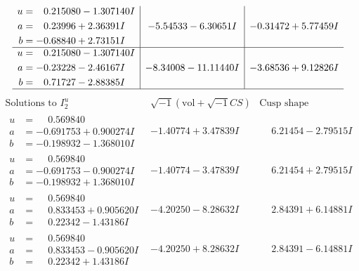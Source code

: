 \documentclass[1p]{elsarticle_modified}
\theoremstyle{definition}
\newcommand{\I}{\sqrt{-1}}
\begin{document}
$$\begin{array}{c|c|c}
\begin{aligned}
u &= \phantom{-}0.215080 - 1.307140 I \\
a &= \phantom{-}0.23996 + 2.36391 I \\
b &= -0.68840 + 2.73151 I\end{aligned}
 & -5.54533 - 6.30651 I & -0.31472 + 5.77459 I \\ \hline\begin{aligned}
u &= \phantom{-}0.215080 - 1.307140 I \\
a &= -0.23228 - 2.46167 I \\
b &= \phantom{-}0.71727 - 2.88385 I\end{aligned}
 & -8.34008 - 11.11440 I & -3.68536 + 9.12826 I\\
 \hline 
 \end{array}$$\newpage$$\begin{array}{c|c|c}  
\text{Solutions to }I^u_{2}& \I (\text{vol} + \sqrt{-1}CS) & \text{Cusp shape}\\
 \hline 
\begin{aligned}
u &= \phantom{-}0.569840\phantom{ +0.000000I} \\
a &= -0.691753 + 0.900274 I \\
b &= -0.198932 - 1.368010 I\end{aligned}
 & -1.40774 + 3.47839 I & \phantom{-}6.21454 - 2.79515 I \\ \hline\begin{aligned}
u &= \phantom{-}0.569840\phantom{ +0.000000I} \\
a &= -0.691753 - 0.900274 I \\
b &= -0.198932 + 1.368010 I\end{aligned}
 & -1.40774 - 3.47839 I & \phantom{-}6.21454 + 2.79515 I \\ \hline\begin{aligned}
u &= \phantom{-}0.569840\phantom{ +0.000000I} \\
a &= \phantom{-}0.833453 + 0.905620 I \\
b &= \phantom{-}0.22342 - 1.43186 I\end{aligned}
 & -4.20250 - 8.28632 I & \phantom{-}2.84391 + 6.14881 I \\ \hline\begin{aligned}
u &= \phantom{-}0.569840\phantom{ +0.000000I} \\
a &= \phantom{-}0.833453 - 0.905620 I \\
b &= \phantom{-}0.22342 + 1.43186 I\end{aligned}
 & -4.20250 + 8.28632 I & \phantom{-}2.84391 - 6.14881 I \\ \hline\begin{aligned}

\end{aligned}
\end{array}$$
\end{document}
